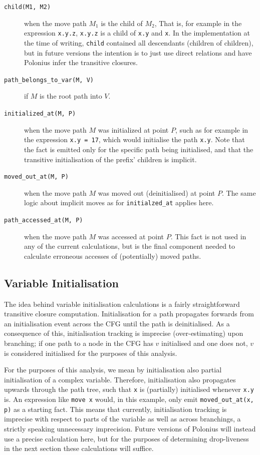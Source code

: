 \documentclass[11pt,a4paper,twoside,openany,draft]{report}
\newcommand{\InRust}[1]{\texttt{#1}}
\newcommand{\InDatalog}[1]{\texttt{#1}}
\begin{document}
\begin{description}
\item[\InDatalog{child(M1, M2)}] when the move path $M_1$ is the child of $M_2$,
  That is, for example in the expression \InRust{x.y.z}, \InRust{x.y.z} is a
  child of \InRust{x.y} and \InRust{x}. In the implementation at the time of
  writing, \InDatalog{child} contained all descendants (children of children),
  but in future versions the intention is to just use direct relations and have
  Polonius infer the transitive closures.

\item[\InDatalog{path_belongs_to_var(M, V)}] if $M$ is the root path into $V$.

\item[\InDatalog{initialized_at(M, P)}] when the move path $M$ was initialized
  at point $P$, such as for example in the expression \InRust{x.y = 17}, which would
  initialise the path \InRust{x.y}. Note that the fact is emitted only for the
  specific path being initialised, and that the transitive initialisation of the
  prefix' children is implicit.

\item[\InDatalog{moved_out_at(M, P)}] when the move path $M$ was moved out
  (deinitialised) at point $P$. The same logic about implicit moves as for
  \InDatalog{initialzed_at} applies here.

\item[\InDatalog{path_accessed_at(M, P)}] when the move path $M$ was accessed at
  point $P$. This fact is not used in any of the current calculations, but is
  the final component needed to calculate erroneous accesses of (potentially)
  moved paths.
\end{description}

\subsection{Variable Initialisation}
\label{sec:var-initalisation}

The idea behind variable initialisation calculations is a fairly straightforward
transitive closure computation. Initialisation for a path propagates forwards
from an initialisation event across the CFG until the path is deinitialised. As
a consequence of this, initialisation tracking is imprecise (over-estimating)
upon branching; if one path to a node in the CFG has $v$ initialised and one
does not, $v$ is considered initialised for the purposes of this analysis.

For the purposes of this analysis, we mean by initialisation also partial
initialisation of a complex variable. Therefore, initialisation also propagates
upwards through the path tree, such that \InRust{x} is (partially) initialised
whenever \InRust{x.y} is. An expression like \InRust{move x} would, in this
example, only emit \InDatalog{moved_out_at(x, p)} as a starting fact. This means
that currently, initialisation tracking is imprecise with respect to parts of
the variable as well as across branchings, a strictly speaking unnecessary
imprecision. Future versions of Polonius will instead use a precise calculation
here, but for the purposes of determining drop-liveness in the next section
these calculations will suffice.
\end{document}
